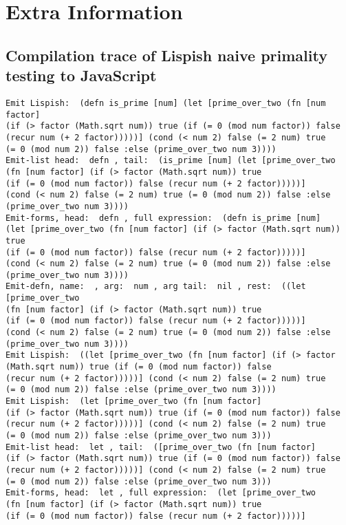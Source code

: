

\chapter{Extra Information}
\section{Compilation trace of Lispish naive primality testing to JavaScript}\label{primality-trace-appendix}
\begin{verbatim}
Emit Lispish:  (defn is_prime [num] (let [prime_over_two (fn [num factor] 
(if (> factor (Math.sqrt num)) true (if (= 0 (mod num factor)) false 
(recur num (+ 2 factor)))))] (cond (< num 2) false (= 2 num) true 
(= 0 (mod num 2)) false :else (prime_over_two num 3))))
Emit-list head:  defn , tail:  (is_prime [num] (let [prime_over_two 
(fn [num factor] (if (> factor (Math.sqrt num)) true 
(if (= 0 (mod num factor)) false (recur num (+ 2 factor)))))] 
(cond (< num 2) false (= 2 num) true (= 0 (mod num 2)) false :else 
(prime_over_two num 3))))
Emit-forms, head:  defn , full expression:  (defn is_prime [num] 
(let [prime_over_two (fn [num factor] (if (> factor (Math.sqrt num)) true 
(if (= 0 (mod num factor)) false (recur num (+ 2 factor)))))] 
(cond (< num 2) false (= 2 num) true (= 0 (mod num 2)) false :else 
(prime_over_two num 3))))
Emit-defn, name:  , arg:  num , arg tail:  nil , rest:  ((let [prime_over_two 
(fn [num factor] (if (> factor (Math.sqrt num)) true 
(if (= 0 (mod num factor)) false (recur num (+ 2 factor)))))] 
(cond (< num 2) false (= 2 num) true (= 0 (mod num 2)) false :else 
(prime_over_two num 3))))
Emit Lispish:  ((let [prime_over_two (fn [num factor] (if (> factor 
(Math.sqrt num)) true (if (= 0 (mod num factor)) false 
(recur num (+ 2 factor)))))] (cond (< num 2) false (= 2 num) true 
(= 0 (mod num 2)) false :else (prime_over_two num 3))))
Emit Lispish:  (let [prime_over_two (fn [num factor] 
(if (> factor (Math.sqrt num)) true (if (= 0 (mod num factor)) false 
(recur num (+ 2 factor)))))] (cond (< num 2) false (= 2 num) true 
(= 0 (mod num 2)) false :else (prime_over_two num 3)))
Emit-list head:  let , tail:  ([prime_over_two (fn [num factor] 
(if (> factor (Math.sqrt num)) true (if (= 0 (mod num factor)) false 
(recur num (+ 2 factor)))))] (cond (< num 2) false (= 2 num) true 
(= 0 (mod num 2)) false :else (prime_over_two num 3)))
Emit-forms, head:  let , full expression:  (let [prime_over_two 
(fn [num factor] (if (> factor (Math.sqrt num)) true 
(if (= 0 (mod num factor)) false (recur num (+ 2 factor)))))] 

\end{verbatim}
